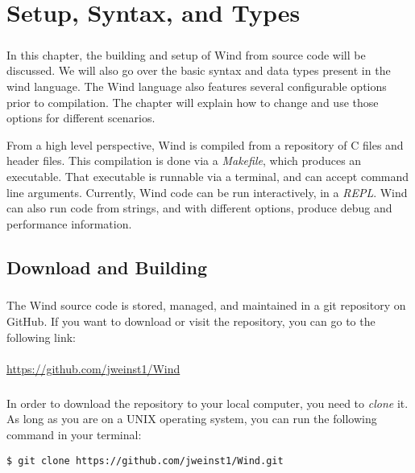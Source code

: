 
\chapter{Setup, Syntax, and Types}

\paragraph{  } In this chapter, the building and setup of Wind from source code will be discussed. We will also go over the basic syntax and data types present in the wind language. The Wind language also features several configurable options prior to compilation. The chapter will explain how to change and use those options for different scenarios.
\par From a high level perspective, Wind is compiled from a repository of C files and header files. This compilation is done via a \emph{Makefile}, which produces an executable. That executable is runnable via a terminal, and can accept command line arguments. Currently, Wind code can be run interactively, in a \emph{REPL}. Wind can also run code from strings, and with different options, produce debug and performance information.

\section{Download and Building}

\paragraph{  } The Wind source code is stored, managed, and maintained in a git repository on GitHub. If you want to download or visit the repository, you can go to the following link: \\
\\
\url{https://github.com/jweinst1/Wind}

\paragraph{  } In order to download the repository to your local computer, you need to \emph{clone} it. As long as you are on a UNIX operating system, you can run the following command in your terminal:

\begin{verbatim}
$ git clone https://github.com/jweinst1/Wind.git
\end{verbatim}

